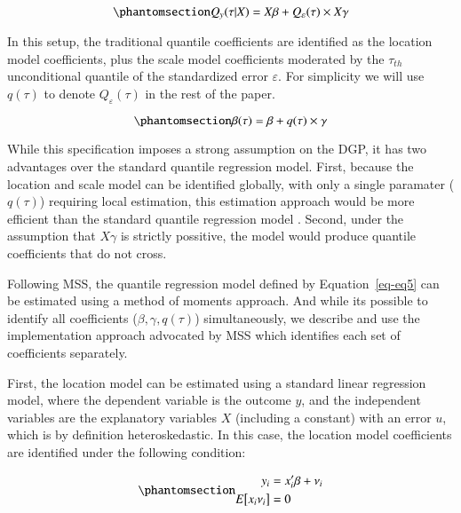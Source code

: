 \documentclass[
  authoryear,
  review,
  1p]{elsarticle}
\begin{document}
\begin{equation}\phantomsection\label{eq-eq5}{Q_y(\tau|X) =X\beta+Q_\varepsilon(\tau) \times X\gamma 
}\end{equation}

In this setup, the traditional quantile coefficients are identified as
the location model coefficients, plus the scale model coefficients
moderated by the \(\tau_{th}\) unconditional quantile of the
standardized error \(\varepsilon\). For simplicity we will use
\(q(\tau)\) to denote \(Q_\varepsilon(\tau)\) in the rest of the paper.

\begin{equation}\phantomsection\label{eq-eq6}{\beta(\tau) = \beta + q(\tau) \times \gamma 
}\end{equation}

While this specification imposes a strong assumption on the DGP, it has
two advantages over the standard quantile regression model. First,
because the location and scale model can be identified globally, with
only a single paramater (\(q(\tau)\)) requiring local estimation, this
estimation approach would be more efficient than the standard quantile
regression model \citep{zhao2000}. Second, under the assumption that
\(X\gamma\) is strictly possitive, the model would produce quantile
coefficients that do not cross.

Following MSS, the quantile regression model defined by
Equation~\ref{eq-eq5} can be estimated using a method of moments
approach. And while its possible to identify all coefficients
(\(\beta,\gamma, q(\tau)\)) simultaneously, we describe and use the
implementation approach advocated by MSS which identifies each set of
coefficients separately.

First, the location model can be estimated using a standard linear
regression model, where the dependent variable is the outcome \(y\), and
the independent variables are the explanatory variables \(X\) (including
a constant) with an error \(u\), which is by definition heteroskedastic.
In this case, the location model coefficients are identified under the
following condition:

\begin{equation}\phantomsection\label{eq-eq7}{\begin{aligned}
      y_i &=x_i'\beta+\nu_i \\
      E\big[ x_i \nu_i\big] &=0
      \end{aligned}
}\end{equation}
\end{document}
